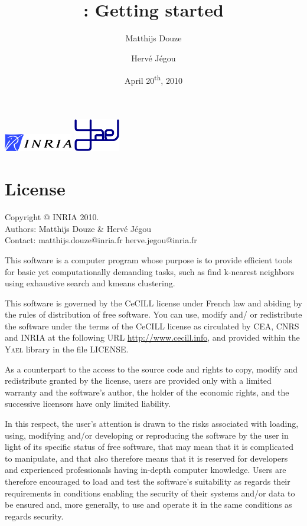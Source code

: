 \documentclass[a4paper,11pt,notitlepage,final,twoside]{report}
\title{~\vspace{9cm} \\ \yael: Getting started}
\author{Matthijs Douze \and Herv\'e J\'egou}
\date{April 20\textsuperscript{th}, 2010}
\newcommand{\yael}{\textsc{Yael}\xspace}
\begin{document}
\maketitle
\thispagestyle{empty}

\vfill

\includegraphics[width=3cm]{./figs/logoinria} \hfill \includegraphics[width=2cm]{./figs/logoyael} 


\newpage

\chapter*{License}

\thispagestyle{empty}

Copyright @ INRIA 2010. \\
Authors: Matthijs Douze \& Herv\'e J\'egou \\
Contact: matthijs.douze@inria.fr  herve.jegou@inria.fr \\
\medskip

This software is a computer program whose purpose is to provide 
efficient tools for basic yet computationally demanding tasks, 
such as find k-nearest neighbors using exhaustive search 
and kmeans clustering. 
\medskip

This software is governed by the CeCILL license under French law and
abiding by the rules of distribution of free software.  You can  use, 
modify and/ or redistribute the software under the terms of the CeCILL
license as circulated by CEA, CNRS and INRIA at the following URL
\url{http://www.cecill.info}, and provided within the \yael library 
in the file LICENSE. 
\medskip

As a counterpart to the access to the source code and  rights to copy,
modify and redistribute granted by the license, users are provided only
with a limited warranty  and the software's author,  the holder of the
economic rights,  and the successive licensors  have only  limited
liability. 
\medskip

In this respect, the user's attention is drawn to the risks associated
with loading,  using,  modifying and/or developing or reproducing the
software by the user in light of its specific status of free software,
that may mean  that it is complicated to manipulate,  and  that  also
therefore means  that it is reserved for developers  and  experienced
professionals having in-depth computer knowledge. Users are therefore
encouraged to load and test the software's suitability as regards their
requirements in conditions enabling the security of their systems and/or 
data to be ensured and,  more generally, to use and operate it in the 
same conditions as regards security. 
\medskip
\end{document}
